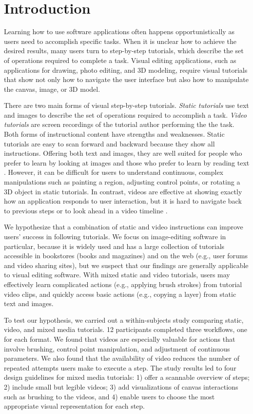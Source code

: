 \section{Introduction}

Learning how to use software applications often happens opportunistically as users need to accomplish specific tasks. When it is unclear how to achieve the desired results, many users turn to step-by-step tutorials, which describe the set of operations required to complete a task. Visual editing applications, such as applications for drawing, photo editing, and 3D modeling, require visual tutorials that show not only how to navigate the user interface but also how to manipulate the canvas, image, or 3D model.

There are two main forms of visual step-by-step tutorials. \emph{Static tutorials} use text and images to describe the set of operations required to accomplish a task. \emph{Video tutorials} are screen recordings of the tutorial author performing the the task. Both forms of instructional content have strengths and weaknesses. Static tutorials are easy to scan forward and backward because they show all instructions. Offering both text and images, they are well suited for people who prefer to learn by looking at images and those who prefer to learn by reading text \cite{Harrison:1995uh}. However, it can be difficult for users to understand continuous, complex manipulations such as painting a region, adjusting control points, or rotating a 3D object in static tutorials. In contrast, videos are effective at showing exactly how an application responds to user interaction, but it is hard to navigate back to previous steps or to look ahead in a video timeline \cite{Pongnumkul:2011ju}.

We hypothesize that a combination of static and video instructions can improve users’ success in following tutorials. We focus on image-editing software in particular, because it is widely used and has a large collection of tutorials accessible in bookstores (books and magazines) and on the web (e.g., user forums and video sharing sites), but we suspect that our findings are generally applicable to visual editing software. With mixed static and video tutorials, users may effectively learn complicated actions (e.g., applying brush strokes) from tutorial video clips, and quickly access basic actions (e.g., copying a layer) from static text and images.

To test our hypothesis, we carried out a within-subjects study comparing static, video, and mixed media tutorials. 12 participants completed three workflows, one for each format. We found that videos are especially valuable for actions that involve brushing, control point manipulation, and adjustment of continuous parameters. We also found that the availability of video reduces the number of repeated attempts users make to execute a step. The study results led to four design guidelines for mixed media tutorials: 1) offer a scannable overview of steps; 2) include small but legible videos; 3) add visualizations of canvas interactions such as brushing to the videos, and 4) enable users to choose the most appropriate visual representation for each step.

